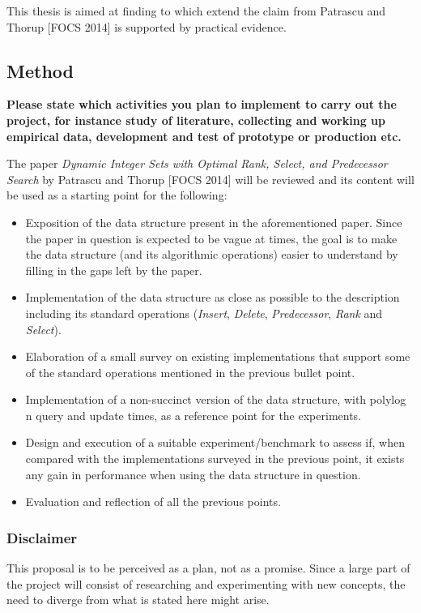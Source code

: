 This thesis is aimed at finding to which extend the claim from Patrascu and Thorup [FOCS 2014] is supported by practical evidence.

\subsection*{Method} 

\textbf{Please state which activities you plan to implement to carry out the project, for instance study of literature, collecting and working up empirical data, development and test of prototype or production etc.}

The paper \textit{Dynamic Integer Sets with Optimal Rank, Select, and Predecessor Search} by Patrascu and Thorup [FOCS 2014] will be reviewed and its content will be used as a starting point for the following:
\begin{itemize}
    \item Exposition of the data structure present in the aforementioned paper. Since the paper in question is expected to be vague at times, the goal is to make the data structure (and its algorithmic operations) easier to understand by filling in the gaps left by the paper.
    \item Implementation of the data structure as close as possible to the description including its standard operations (\textit{Insert}, \textit{Delete}, \textit{Predecessor}, \textit{Rank} and \textit{Select}).
    \item Elaboration of a small survey on existing implementations that support some of the standard operations mentioned in the previous bullet point.
    \item Implementation of a non-succinct version of the data structure, with polylog n query and update times, as a reference point for the experiments.
    \item Design and execution of a suitable experiment/benchmark to assess if, when compared with the implementations surveyed in the previous point, it exists any gain in performance when using the data structure in question.
    \item Evaluation and reflection of all the previous points.
\end{itemize}

\subsubsection*{Disclaimer}
This proposal is to be perceived as a plan, not as a promise. Since a large part of the project will consist of researching and experimenting with new concepts, the need to diverge from what is stated here might arise.

